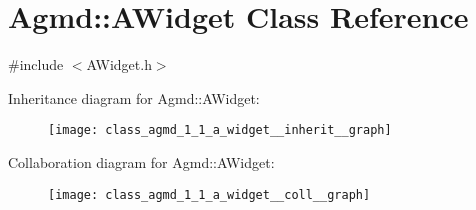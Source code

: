 \hypertarget{class_agmd_1_1_a_widget}{\section{Agmd\+:\+:A\+Widget Class Reference}
\label{class_agmd_1_1_a_widget}
}


{\ttfamily \#include $<$A\+Widget.\+h$>$}



Inheritance diagram for Agmd\+:\+:A\+Widget\+:\nopagebreak
\begin{figure}[H]
\begin{center}
\leavevmode
\texttt{[image: class\_agmd\_1\_1\_a\_widget\_\_inherit\_\_graph]}
\end{center}
\end{figure}


Collaboration diagram for Agmd\+:\+:A\+Widget\+:\nopagebreak
\begin{figure}[H]
\begin{center}
\leavevmode
\texttt{[image: class\_agmd\_1\_1\_a\_widget\_\_coll\_\_graph]}
\end{center}
\end{figure}

